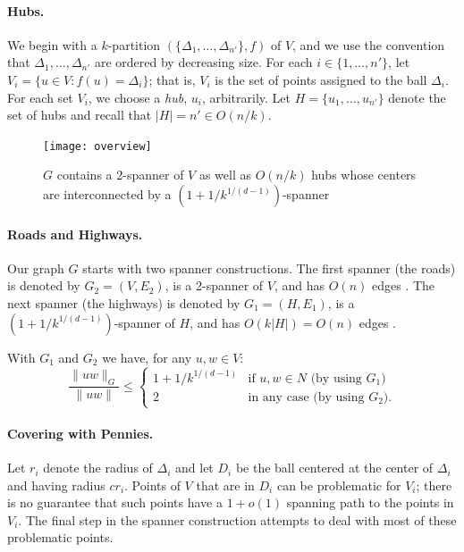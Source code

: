 \documentclass{patmorin}
\begin{document}
\paragraph{Hubs.}

We begin with a $k$-partition $(\{\Delta_1,\ldots,\Delta_{n'}\},f)$
of $V$, and we use the convention that $\Delta_1,\ldots,\Delta_{n'}$
are ordered by decreasing size.  For each $i\in \{1,\ldots,n'\}$,
let $V_i=\{u\in V : f(u)=\Delta_i\}$; that is, $V_i$ is the set of
points assigned to the ball $\Delta_i$.  For each set $V_i$, we choose
a \emph{hub}, $u_i$, arbitrarily. Let $H=\{u_1,\ldots,u_{n'}\}$ denote
the set of hubs and recall that $|H|=n'\in O(n/k)$.

\begin{figure}
  \begin{center} 
    \texttt{[image: overview]}
  \end{center} 
  \caption{$G$ contains a 2-spanner of $V$ as well as $O(n/k)$ hubs whose
    centers are interconnected by a $(1+1/k^{1/(d-1)})$-spanner}
\end{figure}

\paragraph{Roads and Highways.}

Our graph $G$ starts with two spanner constructions.
The first spanner (the roads) is denoted by
$G_2=(V,E_2)$, is a 2-spanner of $V$, and has $O(n)$ edges
\cite{callahan.kosaraju:faster,salowe:constructing,vaidya:sparse}.
The next spanner (the highways) is denoted by $G_1=(H,E_1)$, is a
$(1+1/k^{1/(d-1)})$-spanner of $H$, and has $O(k|H|)=O(n)$ edges
\cite{carmi.smid:optimal,ruppert.seidel:approximating}.

With $G_1$ and $G_2$ we have, for any $u,w\in V$:
\[
   \frac{\|uw\|_G}{\|uw\|} \le \begin{cases}
         1+1/k^{1/(d-1)} & \text{if $u,w\in N$ (by using $G_1$)} \\
         2 & \text{in any case (by using $G_2$).}
       \end{cases}
\]

\paragraph{Covering with Pennies.}

Let $r_i$ denote the radius of $\Delta_i$ and let $D_i$ be the ball
centered at the center of $\Delta_i$ and having radius $cr_i$.  Points of
$V$ that are in $D_i$ can be problematic for $V_i$; there is no guarantee
that such points have a $1+o(1)$ spanning path to the points in $V_i$.
The final step in the spanner construction attempts to deal with most
of these problematic points.
\end{document}
